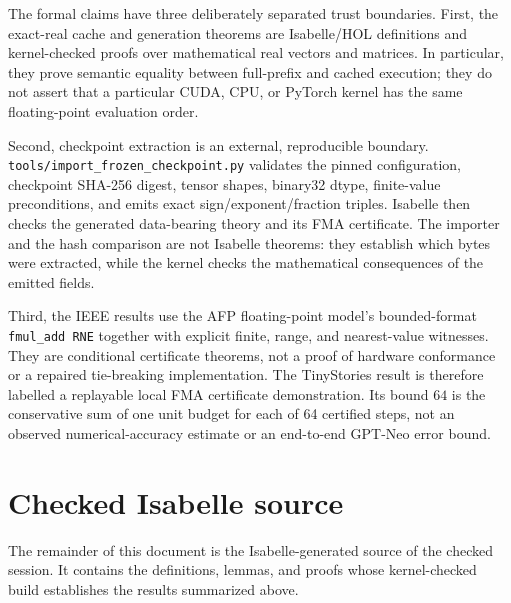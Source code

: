\documentclass[11pt,a4paper]{article}
\begin{document}
The formal claims have three deliberately separated trust boundaries.  First,
the exact-real cache and generation theorems are Isabelle/HOL definitions and
kernel-checked proofs over mathematical real vectors and matrices.  In
particular, they prove semantic equality between full-prefix and cached
execution; they do not assert that a particular CUDA, CPU, or PyTorch kernel
has the same floating-point evaluation order.

Second, checkpoint extraction is an external, reproducible boundary.
\texttt{tools/import\_frozen\_checkpoint.py} validates the pinned configuration,
checkpoint SHA-256 digest, tensor shapes, binary32 dtype, finite-value
preconditions, and emits exact sign/exponent/fraction triples.  Isabelle then
checks the generated data-bearing theory and its FMA certificate.  The
importer and the hash comparison are not Isabelle theorems: they establish
which bytes were extracted, while the kernel checks the mathematical
consequences of the emitted fields.

Third, the IEEE results use the AFP floating-point model's bounded-format
\texttt{fmul\_add RNE} together with explicit finite, range, and nearest-value
witnesses.  They are conditional certificate theorems, not a proof of
hardware conformance or a repaired tie-breaking implementation.  The
TinyStories result is therefore labelled a replayable local FMA certificate
demonstration.  Its bound $64$ is the conservative sum of one unit budget for
each of 64 certified steps, not an observed numerical-accuracy estimate or an
end-to-end GPT-Neo error bound.

\section{Checked Isabelle source}

The remainder of this document is the Isabelle-generated source of the checked
session.  It contains the definitions, lemmas, and proofs whose kernel-checked
build establishes the results summarized above.

\sloppy

\fussy

\nocite{Shazeer2019}


\end{document}
